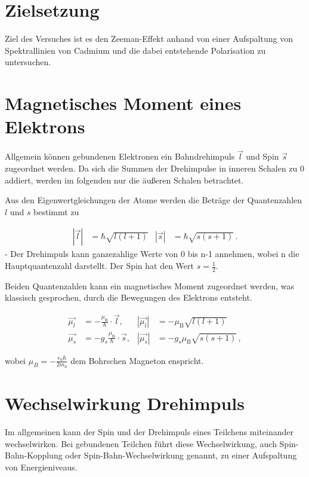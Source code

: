 \section{Zielsetzung}
Ziel des Versuches ist es den Zeeman-Effekt anhand von einer Aufspaltung von Spektrallinien von Cadmium und die dabei entstehende Polarisation zu untersuchen.

\section{Magnetisches Moment eines Elektrons}
Allgemein können gebundenen Elektronen ein Bahndrehimpuls $\vec{l}$ und Spin $\vec{s}$ zugeordnet werden. Da sich die Summen der Drehimpulse in inneren Schalen  zu 0 addiert, werden
im folgenden nur die äußeren Schalen betrachtet. 

\noindent
Aus den Eigenwertgleichungen der Atome werden die Beträge der Quantenzahlen $l$ und $s$ bestimmt zu 

\vspace{-25pt}
\begin{align}
    |\vec{l}| &= \hbar \sqrt{l(l+1)} & |\vec{s}| &= \hbar \sqrt{s(s+1)} \, .
\end{align}
-
\noindent
Der Drehimpuls kann ganzezahlige Werte von 0 bis n-1 annehmen, wobei n die Hauptquantenzahl darstellt. Der Spin hat den Wert $s=\frac{1}{2}$. 

\noindent
Beiden Quantenzahlen kann ein magnetisches Moment zugeordnet werden, was klassisch gesprochen, durch die Bewegungen des Elektrons entsteht. 

\vspace{-15pt}
\begin{align}
    \vec{\mu_l} &= - \frac{\mu_\text{B}}{\hbar} \cdot \vec{l}, & |\vec{\mu_l}|& = - \mu_\text{B} \sqrt{l(l+1)}\\
    \vec{\mu_s} &= - g_s \frac{\mu_\text{B}}{\hbar} \cdot \vec{s}, & |\vec{\mu_s}| &= - g_s \mu_\text{B} \sqrt{s(s+1)} \, ,
\end{align}

\noindent
wobei $\mu_B = -\frac{e_0 \hbar}{2 m_0}$ dem Bohrschen Magneton enspricht. 

\section{Wechselwirkung Drehimpuls}
Im allgemeinen kann der Spin und der Drehimpuls eines Teilchens miteinander wechselwirken. Bei gebundenen Teilchen führt 
diese Wechselwirkung, auch Spin-Bahn-Kopplung oder Spin-Bahn-Wechselwirkung genannt, zu einer Aufspaltung von Energieniveaus.


